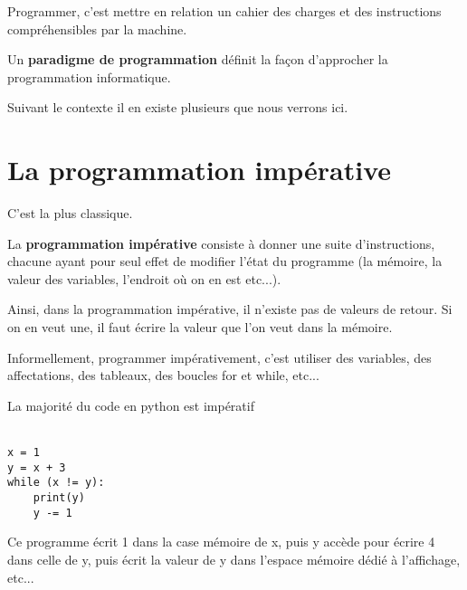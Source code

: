 
Programmer, c'est mettre en relation un cahier des charges et des instructions compréhensibles par la machine.
\begin{definition}
	Un \textbf{paradigme de programmation} définit la façon d'approcher la programmation informatique.
\end{definition}

Suivant le contexte il en existe plusieurs que nous verrons ici.


\section{La programmation impérative}

C'est la plus classique.

\begin{definition}
	La \textbf{programmation impérative} consiste à donner une suite d'instructions, chacune ayant pour seul effet de modifier l'état du programme (la mémoire, la valeur des variables, l'endroit où on en est etc...).
\end{definition}

\begin{rem}
	Ainsi, dans la programmation impérative, il n'existe pas de valeurs de retour. Si on en veut une, il faut écrire la valeur que l'on veut dans la mémoire.
\end{rem}

\begin{rem}
	Informellement, programmer impérativement, c'est utiliser des variables, des affectations, des tableaux, des boucles for et while, etc...
\end{rem}

\begin{example}
	La majorité du code en python est impératif\\\\
	\begin{minipage}{0.2\linewidth}
		\begin{lstlisting}
x = 1
y = x + 3
while (x != y):
    print(y)
    y -= 1
		\end{lstlisting}
	\end{minipage} \quad \begin{minipage}{0.75 \linewidth}
		Ce programme écrit 1 dans la case mémoire de x, puis y accède pour écrire 4 dans celle de y, puis écrit la valeur de y dans l'espace mémoire dédié à l'affichage, etc...
	\end{minipage}
\end{example}

